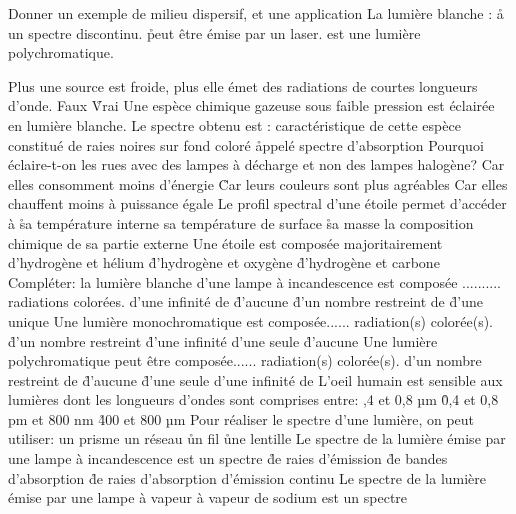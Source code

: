 \q
Donner un exemple de milieu dispersif, et une application
   \q
       La lumière blanche :
\r
	a un spectre discontinu.
\r
	peut être émise par un laser.
\rv
	est une lumière polychromatique.

\q
Plus une source est froide, plus elle émet des radiations de courtes longueurs d'onde.
\rv
Faux
\r
Vrai
\q
Une espèce chimique gazeuse sous faible pression est éclairée en lumière blanche. Le spectre obtenu est :
\rv
caractéristique de cette espèce
\rv
constitué de raies noires sur fond coloré
\r
appelé spectre d'absorption
\q
Pourquoi éclaire-t-on les rues avec des lampes à décharge et non des lampes halogène?
\rv
Car elles consomment moins d'énergie
\r
Car leurs couleurs sont plus agréables
\rv
Car elles chauffent moins à puissance égale
\q
Le profil spectral d'une étoile permet d'accéder à 
\r
sa température interne
\rv
sa température de surface
\r
sa masse
\rv
la composition chimique de sa partie externe
\q 
Une étoile est composée majoritairement
\rv
d'hydrogène et hélium
\r
d'hydrogène et oxygène
\r
d'hydrogène et carbone
\q
Compléter: la lumière blanche d'une lampe à incandescence est composée .......... radiations colorées.
\rv
   d'une infinité de
\r
    d'aucune
\r
      d'un nombre restreint de
\r
    d'une unique
     \q
	Une lumière monochromatique est composée...... radiation(s) colorée(s).
\r
       d'un nombre restreint 
\r
    d'une infinité 
\rv
    d'une seule 
\r
    d'aucune 
\q
	Une lumière polychromatique peut être composée......  radiation(s) colorée(s). 
\rv
    d'un nombre restreint de
\r
    d'aucune 
\r
    d'une seule 
\rv
    d'une infinité de
\q
	L'oeil humain est sensible aux lumières dont les longueurs d'ondes sont comprises entre:
,4 et 0,8 µm
\r
    0,4 et 0,8 pm
 et 800 nm
\r
    400 et 800 µm
     \q
       Pour réaliser le spectre d'une lumière, on peut utiliser:
     \rv
       un prisme
       \rv
       un réseau
       \r
       un fil
       \r
       une lentille
\q
Le spectre de la lumière émise par une lampe à incandescence est un spectre
\r
       de raies d'émission
\r
       de bandes d'absorption
\r
       de raies d'absorption
\rv
       d'émission continu
\q
Le spectre de la lumière émise par une lampe à vapeur à vapeur de sodium est un spectre 
